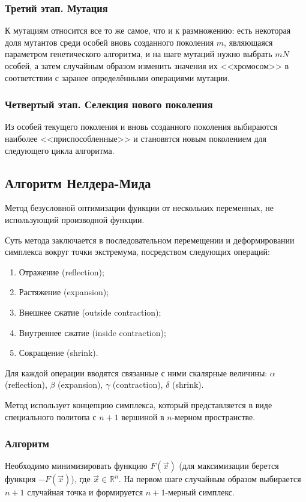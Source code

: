 \subsubsection{Третий этап. Мутация}
\noindent\indent К мутациям относится все то же самое, что и к размножению: есть
некоторая доля мутантов среди особей вновь созданного поколения $m$, являющаяся
параметром генетического алгоритма, и на шаге мутаций нужно выбрать $mN$ особей,
а затем случайным образом изменить значения их <<хромосом>> в соответствии с заранее
определёнными операциями мутации.
\subsubsection{Четвертый этап. Селекция нового поколения}
\noindent\indent Из особей текущего поколения и вновь созданного поколения выбираются
наиболее <<приспособленные>> и становятся новым поколением для следующего цикла
алгоритма.
\subsection{Алгоритм Нелдера-Мида}
\noindent\indent Метод безусловной оптимизации функции от нескольких переменных,
не использующий производной функции.\par
  Суть метода заключается в последовательном перемещении и деформировании симплекса
вокруг точки экстремума, посредством следующих операций:\par
\begin{enumerate}
  \item Отражение (reflection);
  \item Растяжение (expansion);
  \item Внешнее сжатие (outside contraction);
  \item Внутреннее сжатие (inside contraction);
  \item Сокращение (shrink).
\end{enumerate}
Для каждой операции вводятся связанные с ними скалярные величины: $\alpha$ (reflection),
$\beta$ (expansion), $\gamma$ (contraction), $\delta$ (shrink).\par
  Метод использует концепцию симплекса, который представляется в виде специального
политопа с $n+1$ вершиной в $n$-мерном пространстве.\par
\subsubsection{Алгоритм}
\noindent\indent Необходимо минимизировать функцию $F(\vec{x})$ (для максимизации
берется функция $-F(\vec{x})$), где $\vec{x} \in \mathbb{R}^n$. На первом
шаге случайным образом выбирается $n+1$ случайная точка и формируется $n+1$-мерный
симплекс.\par
